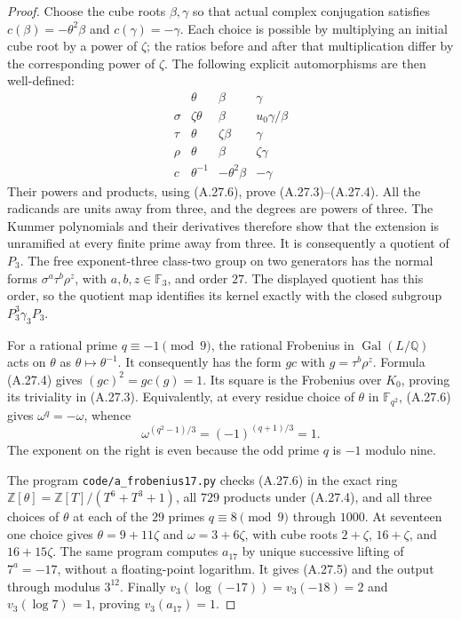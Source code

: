\begin{proof}
Choose the cube roots $\beta,\gamma$ so that actual
complex conjugation satisfies
$c(\beta)=-\theta^2\beta$ and $c(\gamma)=-\gamma$.
Each choice is possible by multiplying an initial
cube root by a power of $\zeta$; the ratios before
and after that multiplication differ by the
corresponding power of $\zeta$. The following
explicit automorphisms are then well-defined:
\[
\begin{array}{c|ccc}
 &\theta&\beta&\gamma\\\hline
 \sigma&\zeta\theta&\beta&u_0\gamma/\beta\\
 \tau&\theta&\zeta\beta&\gamma\\
 \rho&\theta&\beta&\zeta\gamma\\
 c&\theta^{-1}&-\theta^2\beta&-\gamma
\end{array}
 \tag{A.27.7}
\]
Their powers and products, using (A.27.6), prove
(A.27.3)--(A.27.4). All the radicands are units
away from three, and the degrees are powers of
three. The Kummer polynomials and their derivatives
therefore show that the extension is unramified
at every finite prime away from three.
It is consequently a quotient of $P_3$.
The free exponent-three class-two group on two
generators has the normal forms
$\sigma^a\tau^b\rho^z$, with $a,b,z\in\mathbb F_3$,
and order $27$. The displayed quotient has this
order, so the quotient map identifies its kernel
exactly with the closed subgroup
$P_3^3\gamma_3P_3$.

For a rational prime $q\equiv-1\pmod9$, the
rational Frobenius in $\operatorname{Gal}(L/\mathbb Q)$
acts on $\theta$ as $\theta\mapsto\theta^{-1}$.
It consequently has the form $g c$ with
$g=\tau^b\rho^z$. Formula (A.27.4) gives
$(gc)^2=g c(g)=1$. Its square is the Frobenius
over $K_0$, proving its triviality in (A.27.3).
Equivalently, at every residue choice of $\theta$
in $\mathbb F_{q^2}$, (A.27.6) gives
$\omega^q=-\omega$, whence
\[
 \omega^{(q^2-1)/3}
       =(-1)^{(q+1)/3}=1.
\]
The exponent on the right is even because the
odd prime $q$ is $-1$ modulo nine.

The program \texttt{code/a\_frobenius17.py}
checks (A.27.6) in the exact ring
$\mathbb Z[\theta]=\mathbb Z[T]/(T^6+T^3+1)$,
all $729$ products under (A.27.4), and all three
choices of $\theta$ at each of the $29$ primes
$q\equiv8\pmod9$ through $1000$. At seventeen
one choice gives $\theta=9+11\zeta$ and
$\omega=3+6\zeta$, with cube roots
$2+\zeta$, $16+\zeta$, and $16+15\zeta$.
The same program computes $a_{17}$ by unique
successive lifting of $7^a=-17$, without a
floating-point logarithm. It gives (A.27.5)
and the output through modulus $3^{12}$.
Finally $v_3(\log(-17))=v_3(-18)=2$ and
$v_3(\log7)=1$, proving $v_3(a_{17})=1$.
\end{proof}

